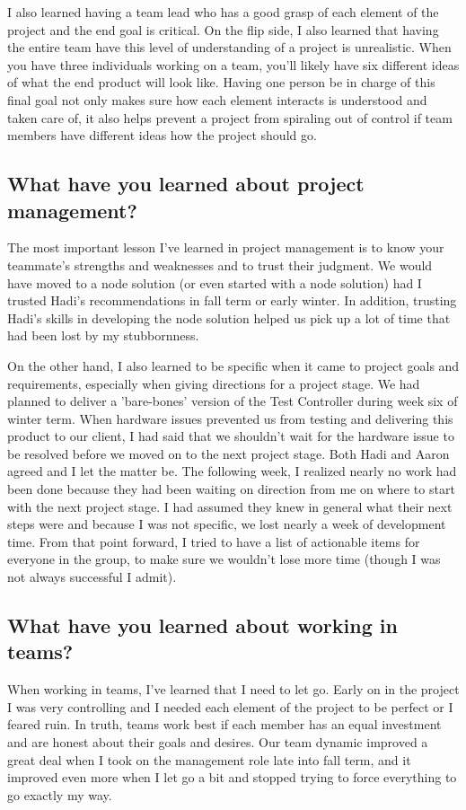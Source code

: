 \documentclass[onecolumn, draftclsnofoot,10pt, compsoc]{report}
\begin{document}
I also learned having a team lead who has a good grasp of each element of the project and the end goal is critical. On the flip side, I also learned that having the entire team have this level of understanding of a project is unrealistic. When you have three individuals working on a team, you'll likely have six different ideas of what the end product will look like. Having one person be in charge of this final goal not only makes sure how each element interacts is understood and taken care of, it also helps prevent a project from spiraling out of control if team members have different ideas how the project should go. 
\subsection{What have you learned about project management?}
The most important lesson I've learned in project management is to know your teammate's strengths and weaknesses and to trust their judgment. We would have moved to a node solution (or even started with a node solution) had I trusted Hadi's recommendations in fall term or early winter. In addition, trusting Hadi's skills in developing the node solution helped us pick up a lot of time that had been lost by my stubbornness.

On the other hand, I also learned to be specific when it came to project goals and requirements, especially when giving directions for a project stage. We had planned to deliver a 'bare-bones' version of the Test Controller during week six of winter term. When hardware issues prevented us from testing and delivering this product to our client, I had said that we shouldn't wait for the hardware issue to be resolved before we moved on to the next project stage. Both Hadi and Aaron agreed and I let the matter be. The following week, I realized nearly no work had been done because they had been waiting on direction from me on where to start with the next project stage. I had assumed they knew in general what their next steps were and because I was not specific, we lost nearly a week of development time. From that point forward, I tried to have a list of actionable items for everyone in the group, to make sure we wouldn't lose more time (though I was not always successful I admit). 
\subsection{What have you learned about working in teams?}
When working in teams, I've learned that I need to let go. Early on in the project I was very controlling and I needed each element of the project to be perfect or I feared ruin. In truth, teams work best if each member has an equal investment and are honest about their goals and desires. Our team dynamic improved a great deal when I took on the management role late into fall term, and it improved even more when I let go a bit and stopped trying to force everything to go exactly my way. 
\end{document}
